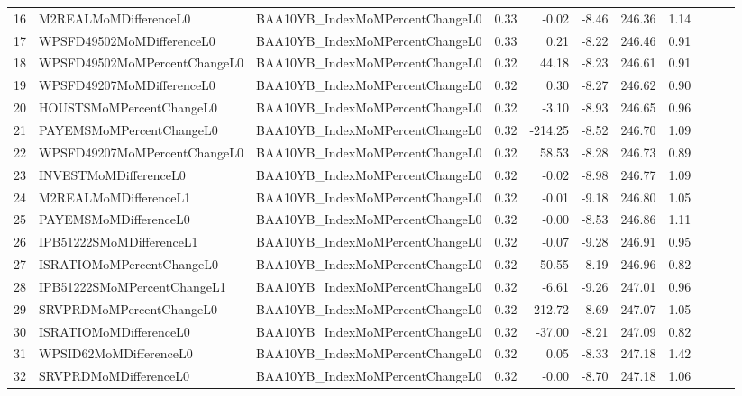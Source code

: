 \begin{longtable}{rllrrrrrlll}
  16 & M2REALMoMDifferenceL0 & BAA10YB\_IndexMoMPercentChangeL0 & 0.33 & -0.02 & -8.46 & 246.36 & 1.14 &  &  &  \\ 
  17 & WPSFD49502MoMDifferenceL0 & BAA10YB\_IndexMoMPercentChangeL0 & 0.33 & 0.21 & -8.22 & 246.46 & 0.91 &  &  &  \\ 
  18 & WPSFD49502MoMPercentChangeL0 & BAA10YB\_IndexMoMPercentChangeL0 & 0.32 & 44.18 & -8.23 & 246.61 & 0.91 &  &  &  \\ 
  19 & WPSFD49207MoMDifferenceL0 & BAA10YB\_IndexMoMPercentChangeL0 & 0.32 & 0.30 & -8.27 & 246.62 & 0.90 &  &  &  \\ 
  20 & HOUSTSMoMPercentChangeL0 & BAA10YB\_IndexMoMPercentChangeL0 & 0.32 & -3.10 & -8.93 & 246.65 & 0.96 &  &  &  \\ 
  21 & PAYEMSMoMPercentChangeL0 & BAA10YB\_IndexMoMPercentChangeL0 & 0.32 & -214.25 & -8.52 & 246.70 & 1.09 &  &  &  \\ 
  22 & WPSFD49207MoMPercentChangeL0 & BAA10YB\_IndexMoMPercentChangeL0 & 0.32 & 58.53 & -8.28 & 246.73 & 0.89 &  &  &  \\ 
  23 & INVESTMoMDifferenceL0 & BAA10YB\_IndexMoMPercentChangeL0 & 0.32 & -0.02 & -8.98 & 246.77 & 1.09 &  &  &  \\ 
  24 & M2REALMoMDifferenceL1 & BAA10YB\_IndexMoMPercentChangeL0 & 0.32 & -0.01 & -9.18 & 246.80 & 1.05 &  &  &  \\ 
  25 & PAYEMSMoMDifferenceL0 & BAA10YB\_IndexMoMPercentChangeL0 & 0.32 & -0.00 & -8.53 & 246.86 & 1.11 &  &  &  \\ 
  26 & IPB51222SMoMDifferenceL1 & BAA10YB\_IndexMoMPercentChangeL0 & 0.32 & -0.07 & -9.28 & 246.91 & 0.95 &  &  &  \\ 
  27 & ISRATIOMoMPercentChangeL0 & BAA10YB\_IndexMoMPercentChangeL0 & 0.32 & -50.55 & -8.19 & 246.96 & 0.82 &  &  &  \\ 
  28 & IPB51222SMoMPercentChangeL1 & BAA10YB\_IndexMoMPercentChangeL0 & 0.32 & -6.61 & -9.26 & 247.01 & 0.96 &  &  &  \\ 
  29 & SRVPRDMoMPercentChangeL0 & BAA10YB\_IndexMoMPercentChangeL0 & 0.32 & -212.72 & -8.69 & 247.07 & 1.05 &  &  &  \\ 
  30 & ISRATIOMoMDifferenceL0 & BAA10YB\_IndexMoMPercentChangeL0 & 0.32 & -37.00 & -8.21 & 247.09 & 0.82 &  &  &  \\ 
  31 & WPSID62MoMDifferenceL0 & BAA10YB\_IndexMoMPercentChangeL0 & 0.32 & 0.05 & -8.33 & 247.18 & 1.42 &  &  &  \\ 
  32 & SRVPRDMoMDifferenceL0 & BAA10YB\_IndexMoMPercentChangeL0 & 0.32 & -0.00 & -8.70 & 247.18 & 1.06 &  &  &  \\ 

\end{longtable}

